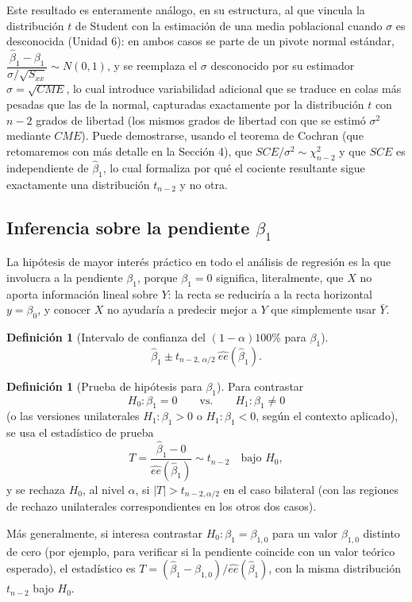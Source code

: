 \documentclass[11pt,a4paper]{article}
\theoremstyle{plain}
\theoremstyle{definition}
\newtheorem{definicion}[teorema]{Definición}
\theoremstyle{remark}
\begin{document}
Este resultado es enteramente análogo, en su estructura, al que vincula la distribución $t$ de Student con la estimación de una media poblacional cuando $\sigma$ es desconocida (Unidad 6): en ambos casos se parte de un pivote normal estándar, $\dfrac{\hat\beta_1-\beta_1}{\sigma/\sqrt{S_{xx}}}\sim N(0,1)$, y se reemplaza el $\sigma$ desconocido por su estimador $\hat\sigma=\sqrt{CME}$, lo cual introduce variabilidad adicional que se traduce en colas más pesadas que las de la normal, capturadas exactamente por la distribución $t$ con $n-2$ grados de libertad (los mismos grados de libertad con que se estimó $\sigma^2$ mediante $CME$). Puede demostrarse, usando el teorema de Cochran (que retomaremos con más detalle en la Sección 4), que $SCE/\sigma^2\sim\chi^2_{n-2}$ y que $SCE$ es independiente de $\hat\beta_1$, lo cual formaliza por qué el cociente resultante sigue exactamente una distribución $t_{n-2}$ y no otra.

\subsection{Inferencia sobre la pendiente \texorpdfstring{$\beta_1$}{beta1}}

La hipótesis de mayor interés práctico en todo el análisis de regresión es la que involucra a la pendiente $\beta_1$, porque $\beta_1=0$ significa, literalmente, que $X$ no aporta información lineal sobre $Y$: la recta se reduciría a la recta horizontal $y=\beta_0$, y conocer $X$ no ayudaría a predecir mejor a $Y$ que simplemente usar $\bar Y$.

\begin{definicion}[Intervalo de confianza del $(1-\alpha)100\%$ para $\beta_1$]
\[
\hat\beta_1 \pm t_{n-2,\,\alpha/2}\ \widehat{ee}(\hat\beta_1).
\]
\end{definicion}

\begin{definicion}[Prueba de hipótesis para $\beta_1$]
Para contrastar
\[
H_0: \beta_1=0 \qquad \text{vs.} \qquad H_1: \beta_1\neq 0
\]
(o las versiones unilaterales $H_1:\beta_1>0$ o $H_1:\beta_1<0$, según el contexto aplicado), se usa el estadístico de prueba
\[
T = \frac{\hat\beta_1-0}{\widehat{ee}(\hat\beta_1)} \sim t_{n-2} \quad \text{bajo } H_0,
\]
y se rechaza $H_0$, al nivel $\alpha$, si $|T|>t_{n-2,\alpha/2}$ en el caso bilateral (con las regiones de rechazo unilaterales correspondientes en los otros dos casos).
\end{definicion}

Más generalmente, si interesa contrastar $H_0:\beta_1=\beta_{1,0}$ para un valor $\beta_{1,0}$ distinto de cero (por ejemplo, para verificar si la pendiente coincide con un valor teórico esperado), el estadístico es $T=(\hat\beta_1-\beta_{1,0})/\widehat{ee}(\hat\beta_1)$, con la misma distribución $t_{n-2}$ bajo $H_0$.
\end{document}
